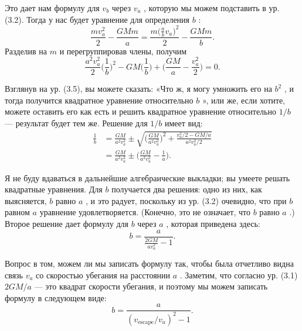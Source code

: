 \documentclass[11pt,oneside]{article}
\begin{document}
Это дает нам формулу для \(v_b\) через \(v_a\) , которую мы можем подставить в ур. (3.2). Тогда у нас будет уравнение для определения \(b\) : 
\begin{equation*} \tag{3.4}
\label{Eq:TIPS:3:4} \frac{mv_a^2}{2} - \frac{GMm}{a} = \frac{m\bigg({\displaystyle \frac{a}{b}v_a}\bigg)^2}{2} - \frac{GMm}{b}. \end{equation*}
 Разделив на \(m\) и перегруппировав члены, получим 
\begin{equation*} \tag{3.5}
\label{Eq:TIPS:3:5} \frac{a^2v_a^2}{2}\bigg(\frac{1}{b}\bigg)^2\!\!\!- GM\bigg(\frac{1}{b}\bigg)\!+\!\bigg(\frac{GM}{a} - \frac{v_a^2}{2}\bigg)\!=0. \end{equation*}
\par

Взглянув на ур. (3.5), вы можете сказать: «Что ж, я могу умножить его на \(b^2\) , и тогда получится квадратное уравнение относительно \(b\) », или же, если хотите, можете оставить его как есть и решить квадратное уравнение относительно \(1/b\) --- результат будет тем же. Решение для \(1/b\) имеет вид: 
\begin{equation*} \begin{aligned} \frac{1}{b} &= \frac{GM}{a^2v_a^2} \pm \sqrt{\bigg(\frac{GM}{a^2v_a^2}\bigg)^2 + \frac{v_a^2/2-GM/a}{a^2v_a^2/2}}\\[1ex] &= \frac{GM}{a^2v_a^2} \pm \bigg(\frac{GM}{a^2v_a^2} - \frac{1}{a}\bigg). \end{aligned} \tag{3.6}
\label{Eq:TIPS:3:6} \end{equation*}
\par

Я не буду вдаваться в дальнейшие алгебраические выкладки; вы умеете решать квадратные уравнения. Для \(b\) получается два решения: одно из них, как выясняется, \(b\) равно \(a\) , и это радует, поскольку из ур. (3.2) очевидно, что при \(b\) равном \(a\) уравнение удовлетворяется. (Конечно, это не означает, что \(b\) равно \(a\) .) Второе решение дает формулу для \(b\) через \(a\) , которая приведена здесь: 
\begin{equation*} \tag{3.7}
\label{Eq:TIPS:3:7} b = \frac{a}{\displaystyle \frac{2GM}{av_a^2}-1}. \end{equation*}
\par

Вопрос в том, можем ли мы записать формулу так, чтобы была отчетливо видна связь \(v_a\) со скоростью убегания на расстоянии \(a\) . Заметим, что согласно ур. (3.1) \(2GM/a\) --- это квадрат скорости убегания, и поэтому мы можем записать формулу в следующем виде: 
\begin{equation*} \tag{3.8}
\label{Eq:TIPS:3:8} b = \frac{a}{(v_\text{escape}/v_a)^2-1}. \end{equation*}
\par
\end{document}
